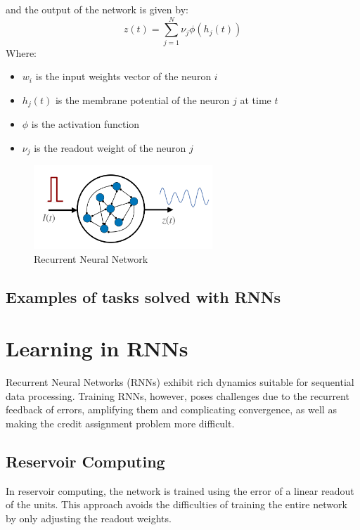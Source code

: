 \documentclass[11pt]{book} %
\begin{document}
and the output of the network is given by:
\[
    z(t) = \sum_{j=1}^N \nu_j \phi(h_j(t))
\]
Where:
\begin{itemize}
    \item $w_i$ is the input weights vector of the neuron $i$
    \item $h_j(t)$ is the membrane potential of the neuron $j$ at time $t$
    \item $\phi$ is the activation function
    \item $\nu_j$ is the readout weight of the neuron $j$
\end{itemize}

\begin{figure}
    \centering
    \includegraphics[width=0.6\textwidth]{Figs/RNN.jpeg}
    \caption{Recurrent Neural Network}
    \label{fig:rnn}
\end{figure}

\subsection{Examples of tasks solved with RNNs}

\section{Learning in RNNs}

Recurrent Neural Networks (RNNs) exhibit rich dynamics suitable for sequential data processing. 
Training RNNs, however, poses challenges due to the recurrent feedback of errors, amplifying them and complicating convergence, 
as well as making the credit assignment problem more difficult.

\subsection{Reservoir Computing}
In reservoir computing, the network is trained using the error of a linear readout of the units. 
This approach avoids the difficulties of training the entire network by only adjusting the readout weights.
\end{document}

